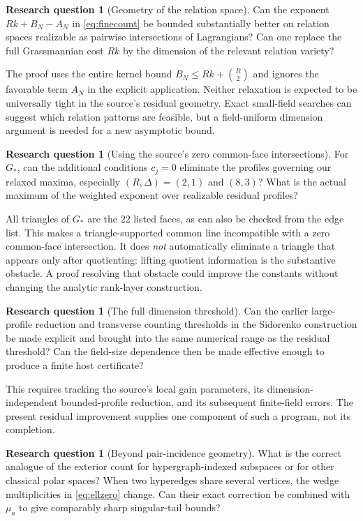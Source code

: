 \documentclass[11pt]{article}
\theoremstyle{definition}
\newtheorem{question}[theorem]{Research question}
\theoremstyle{remark}
\newcommand{\1}{\mathbf 1}
\begin{document}
\begin{question}[Geometry of the relation space]
Can the exponent $Rk+B_N-A_N$ in \eqref{eq:finecount} be bounded substantially
better on relation spaces realizable as pairwise intersections of Lagrangians?
Can one replace the full Grassmannian cost $Rk$ by the dimension of the relevant
relation variety?
\end{question}

The proof uses the entire kernel bound
$B_N\le Rk+\binom R2$ and ignores the favorable term $A_N$ in the explicit
application. Neither relaxation is expected to be universally tight in the
source's residual geometry. Exact small-field searches can suggest which
relation patterns are feasible, but a field-uniform dimension argument is
needed for a new asymptotic bound.

\begin{question}[Using the source's zero common-face intersections]
For $G_*$, can the additional conditions $c_j=0$ eliminate the profiles governing
our relaxed maxima, especially $(R,\Delta)=(2,1)$ and $(8,3)$? What is the actual
maximum of the weighted exponent over realizable residual profiles?
\end{question}

All triangles of $G_*$ are the 22 listed faces, as can also be checked from the
edge list. This makes a triangle-supported common line incompatible with a
zero common-face intersection. It does \emph{not} automatically eliminate a
triangle that appears only after quotienting: lifting quotient information is
the substantive obstacle. A proof resolving that obstacle could improve the
constants without changing the analytic rank-layer construction.

\begin{question}[The full dimension threshold]
Can the earlier large-profile reduction and transverse counting thresholds in
the Sidorenko construction be made explicit and brought into the same numerical
range as the residual threshold? Can the field-size dependence then be made
effective enough to produce a finite host certificate?
\end{question}

This requires tracking the source's local gain parameters, its dimension-
independent bounded-profile reduction, and its subsequent finite-field errors.
The present residual improvement supplies one component of such a program,
not its completion.

\begin{question}[Beyond pair-incidence geometry]
What is the correct analogue of the exterior count for hypergraph-indexed
subspaces or for other classical polar spaces? When two hyperedges share
several vertices, the wedge multiplicities in \eqref{eq:ellzero} change.
Can their exact correction be combined with $\mu_a$ to give comparably sharp
singular-tail bounds?
\end{question}
\end{document}
